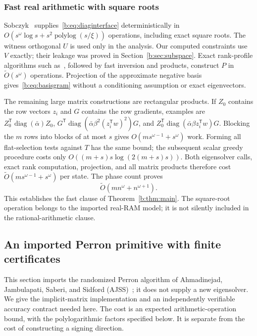 \documentclass[11pt]{amsart}
\theoremstyle{definition}\newtheorem{definition}[theorem]{Definition}
\theoremstyle{remark}\newtheorem{remark}[theorem]{Remark}
\numberwithin{equation}{section}
\newcommand{\diag}{\operatorname{diag}}
\newcommand{\T}{\mathsf T}
\begin{document}
\subsubsection{Fast real arithmetic with square roots}
Sobczyk~\cite[Corollaries 2.1 and C.2]{Sob} supplies~\eqref{b:eq:diaginterface}
deterministically in
$O(s^\omega\log s+s^2\operatorname{polylog}(s/\xi))$ operations,
including exact square roots. The witness orthogonal $U$ is used only in the
analysis. Our computed constraints use $V$ exactly; their leakage was proved
in Section~\ref{b:sec:subspace}.
Exact rank-profile algorithms such as~\cite{DPS}, followed by fast inversion
and products, construct $P$ in $\widetilde O(s^\omega)$ operations.
Projection of the approximate negative basis gives~\eqref{b:eq:basisgram}
without a conditioning assumption or exact eigenvectors.

The remaining large matrix constructions are rectangular products. If
$Z_0$ contains the row vectors $z_i$ and $G$ contains the row gradients,
examples are
$Z_0^\T\diag(\bar\alpha)Z_0$,
$G^\T\diag(\bar\alpha\beta^2(z_i^\T w)^2)G$, and
$Z_0^\T\diag(\bar\alpha\beta z_i^\T w)G$.
Blocking the $m$ rows into blocks of at most $s$ gives
$O(ms^{\omega-1}+s^\omega)$ work. Forming all flat-selection tests against
$T$ has the same bound; the subsequent scalar greedy procedure costs only
$O((m+s)s\log(2(m+s)s))$.
Both eigensolver calls, exact rank computation, projection, and all matrix
products therefore cost $\widetilde O(ms^{\omega-1}+s^\omega)$ per state.
The phase count proves
\[
 \widetilde O(mn^\omega+n^{\omega+1}).
\]
This establishes the fast clause of Theorem~\ref{b:thm:main}. The square-root
operation belongs to the imported real-RAM model; it is not silently included
in the rational-arithmetic clause.




\subsection{An imported Perron primitive with finite certificates}
\label{p:section}
This section imports the randomized Perron algorithm of
Ahmadinejad, Jambulapati, Saberi, and Sidford (AJSS)~\cite{AJSS}; it does not
supply a new eigensolver.  We give the implicit-matrix implementation and
an independently verifiable accuracy contract needed here.  The cost is
an expected arithmetic-operation bound, with the polylogarithmic factors
specified below.  It is separate from the cost of constructing a signing
direction.
\end{document}
